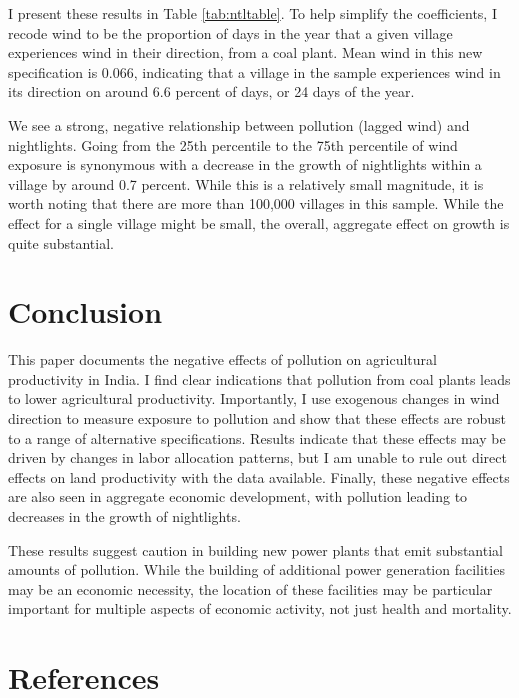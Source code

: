 \documentclass[
]{article}
\begin{document}
I present these results in Table \ref{tab:ntltable}. To help simplify the coefficients, I recode wind to be the proportion of days in the year that a given village experiences wind in their direction, from a coal plant. Mean wind in this new specification is 0.066, indicating that a village in the sample experiences wind in its direction on around 6.6 percent of days, or 24 days of the year.

We see a strong, negative relationship between pollution (lagged wind) and nightlights. Going from the 25th percentile to the 75th percentile of wind exposure is synonymous with a decrease in the growth of nightlights within a village by around 0.7 percent. While this is a relatively small magnitude, it is worth noting that there are more than 100,000 villages in this sample. While the effect for a single village might be small, the overall, aggregate effect on growth is quite substantial.

\hypertarget{conclusion}{%
\section{\texorpdfstring{Conclusion \label{conclusion}}{Conclusion }}\label{conclusion}}

This paper documents the negative effects of pollution on agricultural productivity in India. I find clear indications that pollution from coal plants leads to lower agricultural productivity. Importantly, I use exogenous changes in wind direction to measure exposure to pollution and show that these effects are robust to a range of alternative specifications. Results indicate that these effects may be driven by changes in labor allocation patterns, but I am unable to rule out direct effects on land productivity with the data available. Finally, these negative effects are also seen in aggregate economic development, with pollution leading to decreases in the growth of nightlights.

These results suggest caution in building new power plants that emit substantial amounts of pollution. While the building of additional power generation facilities may be an economic necessity, the location of these facilities may be particular important for multiple aspects of economic activity, not just health and mortality.

\FloatBarrier
\newpage
\singlespacing

\hypertarget{references}{%
\section*{References}\label{references}}
\end{document}
